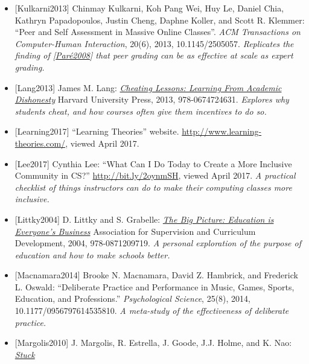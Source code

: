 \documentclass[10pt,statementpaper]{memoir}
\begin{document}
\begin{itemize}
{  of teaching them.}
\item
  \protect\hypertarget{kulkarni-peer-grading}{}{{[}Kulkarni2013{]}}
  Chinmay Kulkarni, Koh Pang Wei, Huy Le, Daniel Chia, Kathryn
  Papadopoulos, Justin Cheng, Daphne Koller, and Scott R. Klemmer:
  ``Peer and Self Assessment in Massive Online Classes''. \emph{ACM
  Transactions on Computer-Human Interaction}, 20(6), 2013,
  10.1145/2505057. \emph{Replicates the finding of
  {[}\href{biblio.html\#pare-joordens-peer}{Paré2008}{]} that peer
  grading can be as effective at scale as expert grading.}
\item
  \protect\hypertarget{lang-cheating}{}{{[}Lang2013{]}} {James M. Lang:
  \emph{\href{https://www.amazon.com/Cheating-Lessons-Learning-Academic-Dishonesty/dp/0674724631/}{Cheating
  Lessons: Learning From Academic Dishonesty}} Harvard University Press,
  2013, 978-0674724631. \emph{Explores why students cheat, and how
  courses often give them incentives to do so.}}
\item
  \protect\hypertarget{learning-theories}{}{{[}Learning2017{]}}
  ``Learning Theories'' website.
  \url{http://www.learning-theories.com/}, viewed April 2017.
\item
  \protect\hypertarget{lee-create-inclusive-community}{}{{[}Lee2017{]}}
  Cynthia Lee: ``What Can I Do Today to Create a More Inclusive
  Community in CS?'' \url{http://bit.ly/2oynmSH}, viewed April 2017.
  \emph{A practical checklist of things instructors can do to make their
  computing classes more inclusive.}
\item
  \protect\hypertarget{littky-big-picture}{}{{[}Littky2004{]}} D. Littky
  and S. Grabelle:
  \emph{\href{https://www.amazon.com/Big-Picture-Education-Everyones-Business/dp/0871209713/}{The
  Big Picture: Education is Everyone's Business}} Association for
  Supervision and Curriculum Development, 2004, 978-0871209719. \emph{A
  personal exploration of the purpose of education and how to make
  schools better.}
\item
  \protect\hypertarget{macnamara-deliberate}{}{{[}Macnamara2014{]}}
  Brooke N. Macnamara, David Z. Hambrick, and Frederick L. Oswald:
  ``Deliberate Practice and Performance in Music, Games, Sports,
  Education, and Professions.'' \emph{Psychological Science}, 25(8),
  2014, 10.1177/0956797614535810. \emph{A meta-study of the
  effectiveness of deliberate practice.}
\item
  \protect\hypertarget{margolis-shallow}{}{{[}Margolis2010{]}} J.
  Margolis, R. Estrella, J. Goode, J.J. Holme, and K. Nao:
  \emph{\href{https://www.amazon.com/Stuck-Shallow-End-Education-Computing/dp/0262514044/}{Stuck
}}
\end{itemize}
\end{document}

